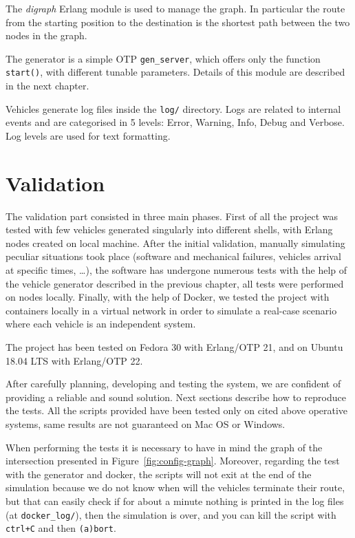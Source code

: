 \documentclass{memoir}
\begin{document}
The \emph{digraph} Erlang module is used to manage the graph. In particular the route from the starting position to the destination is the shortest path between the two nodes in the graph.

\bigskip
The generator is a simple OTP \verb|gen_server|, which offers only the function \verb|start()|, with different tunable parameters. Details of this module are described in the next chapter.

\bigskip
Vehicles generate log files inside the \verb|log/| directory. Logs are related to internal events and are categorised in 5 levels: Error, Warning, Info, Debug and Verbose. Log levels are used for text formatting. 


\chapter{Validation}\label{ch:validation}
The validation part consisted in three main phases. First of all the project was tested with few vehicles generated singularly into different shells, with Erlang nodes created on local machine. After the initial validation, manually simulating peculiar situations took place (software and mechanical failures, vehicles arrival at specific times, \dots), the software has undergone numerous tests with the help of the vehicle generator described in the previous chapter, all tests were performed on nodes locally. Finally, with the help of Docker, we tested the project with containers locally in a virtual network in order to simulate a real-case scenario where each vehicle is an independent system.

The project has been tested on Fedora 30 with Erlang/OTP 21, and on Ubuntu 18.04 LTS with Erlang/OTP 22.

After carefully planning, developing and testing the system, we are confident of providing a reliable and sound solution. Next sections describe how to reproduce the tests. All the scripts provided have been tested only on cited above operative systems, same results are not guaranteed on Mac OS or Windows.

When performing the tests it is necessary to have in mind the graph of the intersection presented in Figure~\ref{fig:config-graph}. Moreover, regarding the test with the generator and docker, the scripts will not exit at the end of the simulation because we do not know when will the vehicles terminate their route, but that can easily check if for about a minute nothing is printed in the log files (at \verb|docker_log/|), then the simulation is over, and you can kill the script with \verb|ctrl+C| and then \verb|(a)bort|.
\end{document}
